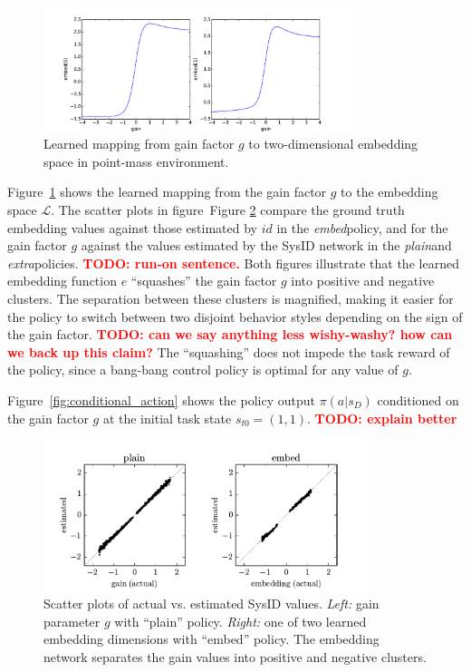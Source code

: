 \documentclass{article}
\newcommand{\TODO}[1]{\textcolor{red}{\textbf{TODO: #1}}}
\newcommand{\cL}{\mathcal{L}}
\newcommand{\plain}{\emph{plain}}
\newcommand{\extra}{\emph{extra}}
\newcommand{\embed}{\emph{embed}}
\newcommand{\embedfn}{e}
\newcommand{\idfn}{id}
\newcommand{\latent}{\cL}
\newcommand{\figref}[1]{Figure \ref{#1}}
\begin{document}
\begin{figure}
\centering
\includegraphics[width=0.8\textwidth]{pointmass_embed_mapping.pdf}
\caption{
Learned mapping from gain factor $g$ to two-dimensional embedding space in point-mass environment.
}
\label{fig:embed-mapping}
\end{figure}
Figure~\ref{fig:embed-mapping} shows the learned mapping from the gain factor $g$
to the embedding space $\latent$.
The scatter plots in figure~\figref{fig:scatter} compare the ground truth embedding values
against those estimated by $\idfn$ in the \embed policy,
and for the gain factor $g$ against the values estimated by the SysID network in the \plain and \extra policies.
\TODO{run-on sentence.}
Both figures illustrate that the learned embedding function $\embedfn$ ``squashes'' the gain factor $g$ into positive and negative clusters.
The separation between these clusters is magnified, making it easier for the policy to switch between two disjoint behavior styles depending on the sign of the gain factor.
\TODO{can we say anything less wishy-washy? how can we back up this claim?}
The ``squashing'' does not impede the task reward of the policy,
since a bang-bang control policy is optimal for any value of $g$.

Figure~\ref{fig:conditional_action} shows the policy output $\pi(a|s_D)$ conditioned on
the gain factor $g$ at the initial task state $s_{t0} = (1, 1)$.
\TODO{explain better}


\begin{figure}
\centering
\includegraphics[width=0.85\textwidth]{pointmass_embed_scatter.pdf}
\caption{Scatter plots of actual vs. estimated SysID values.
\emph{Left:} gain parameter $g$ with ``plain'' policy.
\emph{Right:} one of two learned embedding dimensions with ``embed'' policy.
The embedding network separates the gain values into positive and negative clusters.
}
\label{fig:scatter}
\end{figure}
\end{document}
